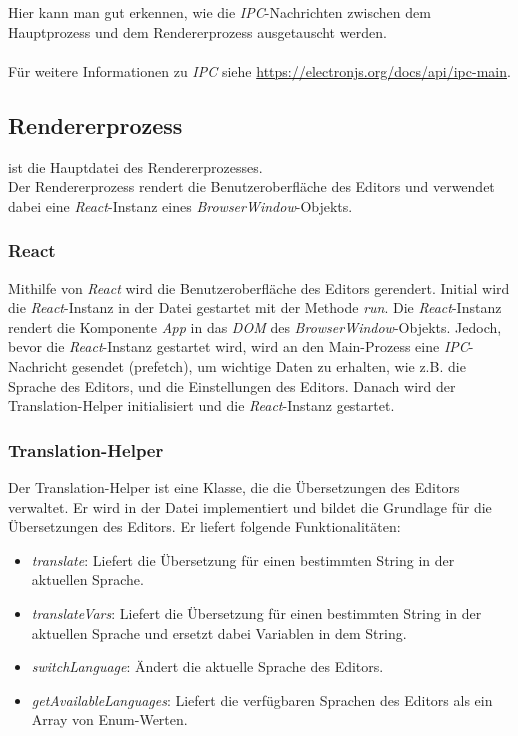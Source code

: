 Hier kann man gut erkennen, wie die \emph{IPC}-Nachrichten zwischen dem Hauptprozess und dem Rendererprozess ausgetauscht werden.
\\\\
Für weitere Informationen zu \emph{IPC} siehe \url{https://electronjs.org/docs/api/ipc-main}.

\subsection{Rendererprozess}\label{subsec:rendererprozess}

 ist die Hauptdatei des Rendererprozesses.\\
Der Rendererprozess rendert die Benutzeroberfläche des Editors und verwendet dabei eine \emph{React}-Instanz eines \emph{BrowserWindow}-Objekts.

\subsubsection{React}

Mithilfe von \emph{React} wird die Benutzeroberfläche des Editors gerendert.
Initial wird die \emph{React}-Instanz in der Datei  gestartet mit der Methode \emph{run}.
Die \emph{React}-Instanz rendert die Komponente \emph{App} in das \emph{DOM} des \emph{BrowserWindow}-Objekts.
Jedoch, bevor die \emph{React}-Instanz gestartet wird, wird an den Main-Prozess eine \emph{IPC}-Nachricht gesendet (prefetch), um wichtige Daten zu erhalten, wie z.B. die Sprache des Editors, und die Einstellungen des Editors.
Danach wird der Translation-Helper initialisiert und die \emph{React}-Instanz gestartet.

\subsubsection{Translation-Helper}

Der Translation-Helper ist eine Klasse, die die Übersetzungen des Editors verwaltet.
Er wird in der Datei  implementiert und bildet die Grundlage für die Übersetzungen des Editors.
Er liefert folgende Funktionalitäten:

\begin{itemize}
	\item \emph{translate}: Liefert die Übersetzung für einen bestimmten String in der aktuellen Sprache.
	\item \emph{translateVars}: Liefert die Übersetzung für einen bestimmten String in der aktuellen Sprache und ersetzt dabei Variablen in dem String.
	\item \emph{switchLanguage}: Ändert die aktuelle Sprache des Editors.
	\item \emph{getAvailableLanguages}: Liefert die verfügbaren Sprachen des Editors als ein Array von Enum-Werten.
\end{itemize}

